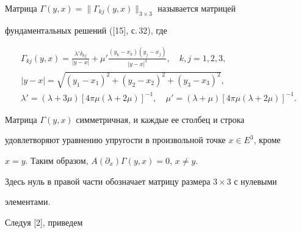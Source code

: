  


 


\begin{defn} 


Матрица $\Gamma(y,x)=\|\Gamma_{kj}(y,x)\|_{3\times 3}$ называется матрицей 


фундаментальных решений ([15], с.\,32), где 


\begin{gather*} 


\Gamma_{kj}(y,x)=\frac{\lambda'\delta_{kj}}{|y-x|}+\mu' 


\frac{(y_k-x_k)(y_j-x_j)}{|y-x|^3},\quad k,j=1,2,3,\\ 


% 


|y-x|=\sqrt{(y_1-x_1)^2+(y_2-x_2)^2+(y_3-x_3)^2},\\ 


% 


\lambda'=(\lambda+3\mu)[4\pi\mu(\lambda+2\mu)]^{-1},\quad 


\mu'=(\lambda+\mu)[4\pi\mu(\lambda+2\mu)]^{-1}. 


\end{gather*} 


 


Матрица $\Gamma(y,x)$ симметричная, и каждые ее столбец и строка 


удовлетворяют уравнению упругости в произвольной точке $x\in E^3$, кроме 


$x=y$. Таким образом, $A(\partial_x)\Gamma(y,x)=0$, $x\ne y$. 


Здесь нуль в правой части обозначает матрицу размера $3\times3$ с нулевыми 


элементами. 


\end{defn} 


 


 


Следуя [2], приведем 


 


 


